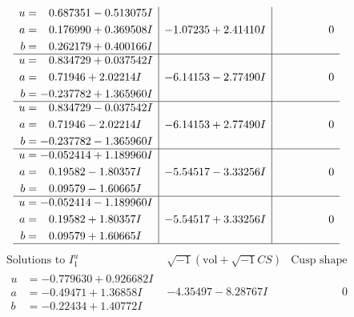 \documentclass[1p]{elsarticle_modified}
\theoremstyle{definition}
\newcommand{\I}{\sqrt{-1}}
\begin{document}
$$\begin{array}{c|c|c}
\begin{aligned}
u &= \phantom{-}0.687351 - 0.513075 I \\
a &= \phantom{-}0.176990 + 0.369508 I \\
b &= \phantom{-}0.262179 + 0.400166 I\end{aligned}
 & -1.07235 + 2.41410 I & \phantom{-0.000000 } 0 \\ \hline\begin{aligned}
u &= \phantom{-}0.834729 + 0.037542 I \\
a &= \phantom{-}0.71946 + 2.02214 I \\
b &= -0.237782 + 1.365960 I\end{aligned}
 & -6.14153 - 2.77490 I & \phantom{-0.000000 } 0 \\ \hline\begin{aligned}
u &= \phantom{-}0.834729 - 0.037542 I \\
a &= \phantom{-}0.71946 - 2.02214 I \\
b &= -0.237782 - 1.365960 I\end{aligned}
 & -6.14153 + 2.77490 I & \phantom{-0.000000 } 0 \\ \hline\begin{aligned}
u &= -0.052414 + 1.189960 I \\
a &= \phantom{-}0.19582 - 1.80357 I \\
b &= \phantom{-}0.09579 - 1.60665 I\end{aligned}
 & -5.54517 - 3.33256 I & \phantom{-0.000000 } 0 \\ \hline\begin{aligned}
u &= -0.052414 - 1.189960 I \\
a &= \phantom{-}0.19582 + 1.80357 I \\
b &= \phantom{-}0.09579 + 1.60665 I\end{aligned}
 & -5.54517 + 3.33256 I & \phantom{-0.000000 } 0\\
 \hline 
 \end{array}$$\newpage$$\begin{array}{c|c|c}  
\text{Solutions to }I^u_{1}& \I (\text{vol} + \sqrt{-1}CS) & \text{Cusp shape}\\
 \hline 
\begin{aligned}
u &= -0.779630 + 0.926682 I \\
a &= -0.49471 + 1.36858 I \\
b &= -0.22434 + 1.40772 I\end{aligned}
 & -4.35497 - 8.28767 I & \phantom{-0.000000 } 0 \\ \hline\begin{aligned}

\end{aligned}
\end{array}$$
\end{document}
